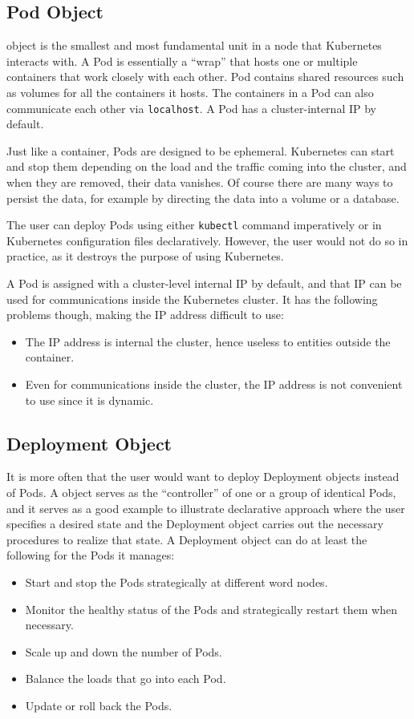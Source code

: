 \subsection{Pod Object}

 object is the smallest and most fundamental unit in a node that Kubernetes interacts with. A Pod is essentially a ``wrap'' that hosts one or multiple containers that work closely with each other. Pod contains shared resources such as volumes for all the containers it hosts. The containers in a Pod can also communicate each other via \verb|localhost|. A Pod has a cluster-internal IP by default.

Just like a container, Pods are designed to be ephemeral. Kubernetes can start and stop them depending on the load and the traffic coming into the cluster, and when they are removed, their data vanishes. Of course there are many ways to persist the data, for example by directing the data into a volume or a database.

The user can deploy Pods using either \verb|kubectl| command imperatively or in Kubernetes configuration files declaratively. However, the user would not do so in practice, as it destroys the purpose of using Kubernetes.

A Pod is assigned with a cluster-level internal IP by default, and that IP can be used for communications inside the Kubernetes cluster. It has the following problems though, making the IP address difficult to use:
\begin{itemize}
  \item The IP address is internal the cluster, hence useless to entities outside the container.
  \item Even for communications inside the cluster, the IP address is not convenient to use since it is dynamic.
\end{itemize}

\subsection{Deployment Object}

It is more often that the user would want to deploy Deployment objects instead of Pods. A  object serves as the ``controller'' of one or a group of identical Pods, and it serves as a good example to illustrate declarative approach where the user specifies a desired state and the Deployment object carries out the necessary procedures to realize that state. A Deployment object can do at least the following for the Pods it manages:
\begin{itemize}
  \item Start and stop the Pods strategically at different word nodes.
  \item Monitor the healthy status of the Pods and strategically restart them when necessary.
  \item Scale up and down the number of Pods.
  \item Balance the loads that go into each Pod.
  \item Update or roll back the Pods.
\end{itemize}

